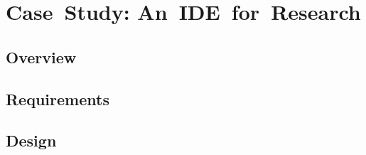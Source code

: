 \chapter{Case~Study: An~IDE~for~Research}

\section {Overview}


\section {Requirements}


\section {Design}
